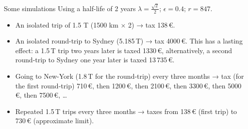 \documentclass[french, english]{beamer}
\begin{document}
\begin{frame}{Some simulations}
    Using a half-life of 2 years $\lambda = \frac{\sqrt{2}}{2}$; $\epsilon = 0.4$; $r = 847$.
    \begin{itemize}
    	\item An isolated trip of 1.5 T (1500 km × 2) → tax 138\,€.
	\item An isolated round-trip to Sydney (5.185\,T) → tax 4000\,€. This has a lasting effect: a 1.5\,T trip two years later is taxed 1330\,€, alternatively, a second round-trip to Sydney one year later is taxed 13\,735\,€.
	\item Going to New-York (1.8\,T for the round-trip) every three months → tax (for the first round-trip) 710\,€, then 1200\,€, then 2100\,€, then 3300\,€, then 5000\,€, then 7500\,€, …
	\item Repeated 1.5\,T trips every three months → taxes from 138\,€ (first trip) to 730\,€ (approximate limit).
	\end{itemize}
\end{frame}
\end{document}
